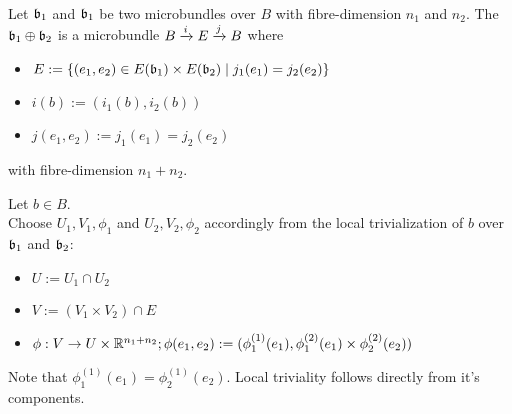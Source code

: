  \\
Let $\bb_1$ and $\bb_1$ be two microbundles over $B$ with fibre-dimension $n_1$ and $n_2$.
The  $\bb_1 \oplus \bb_2$ is a microbundle $\bundle{B}{E}{i}{j}$ where
\begin{itemize}
    \item $E := \{ (e_1, e_2) \in E(\bb_1) \times E(\bb_2) \mid j_1(e_1) = j_2(e_2)\}$
    \item $i(b) := (i_1(b), i_2(b))$
    \item $j(e_1, e_2) := j_1(e_1) = j_2(e_2)$
\end{itemize}
with fibre-dimension $n_1 + n_2$.
\begin{myproof}
Let $b \in B$. \\
Choose $U_1, V_1, \phi_1$ and $U_2, V_2, \phi_2$ accordingly from the local trivialization of $b$ over $\bb_1$ and $\bb_2$:
\begin{itemize}
    \item $U := U_1 \cap U_2$
    \item $V := (V_1 \times V_2) \cap E$
    \item $\phi: V \to U \times \R^{n_1 + n_2}; \phi(e_1, e_2) := (\phi_1^{(1)}(e_1), \phi_1^{(2)}(e_1) \times  \phi_2^{(2)}(e_2))$
\end{itemize}
Note that $\phi_1^{(1)}(e_1) = \phi_2^{(1)}(e_2)$.
Local triviality follows directly from it's components.
\end{myproof}